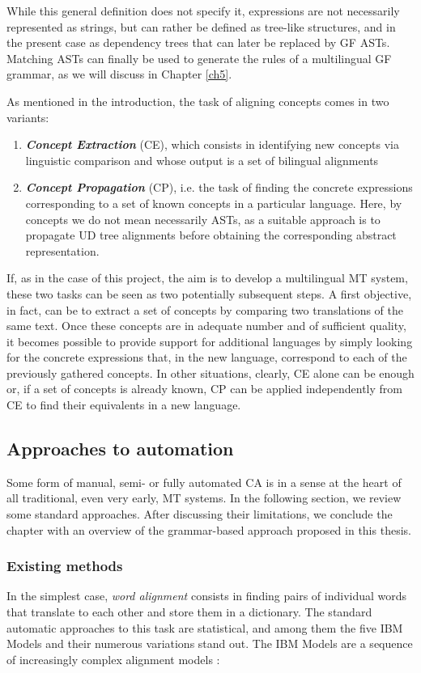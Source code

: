 While this general definition does not specify it, expressions are not necessarily represented as strings, but can rather be defined as tree-like structures, and in the present case as dependency trees that can later be replaced by GF ASTs. Matching ASTs can finally be used to generate the rules of a multilingual GF grammar, as we will discuss in Chapter \ref{ch5}. \smallskip

As mentioned in the introduction, the task of aligning concepts comes in two variants:
\begin{enumerate}
    \item \textbf{\textit{Concept Extraction}} (CE), which consists in identifying new concepts via linguistic comparison and whose output is a set of bilingual alignments
    \item \textbf{\textit{Concept Propagation}} (CP), i.e. the task of finding the concrete expressions corresponding to a set of known concepts in a particular language. Here, by concepts we do not mean necessarily ASTs, as a suitable approach is to propagate UD tree alignments before obtaining the corresponding abstract representation.
\end{enumerate} \smallskip

If, as in the case of this project, the aim is to develop a multilingual MT system, these two tasks can be seen as two potentially subsequent steps. A first objective, in fact, can be to extract a set of concepts by comparing two translations of the same text. Once these concepts are in adequate number and of sufficient quality, it becomes possible to provide support for additional languages by simply looking for the concrete expressions that, in the new language, correspond to each of the previously gathered concepts. In other situations, clearly, CE alone can be enough or, if a set of concepts is already known, CP can be applied independently from CE to find their equivalents in a new language.

\subsection{Approaches to automation} 
Some form of manual, semi- or fully automated CA is in a sense at the heart of all traditional, even very early, MT systems. 
In the following section, we review some standard approaches. After discussing their limitations, we conclude the chapter with an overview of the grammar-based approach proposed in this thesis.

\subsubsection{Existing methods} \label{statmt}  
In the simplest case, \textit{word alignment} consists in finding pairs of individual words that translate to each other and store them in a dictionary. 
The standard automatic approaches to this task are statistical, and among them the five IBM Models \cite{ibm} and their numerous variations stand out. 
The IBM Models are a sequence of increasingly complex alignment models \cite{bitext}: \smallskip

